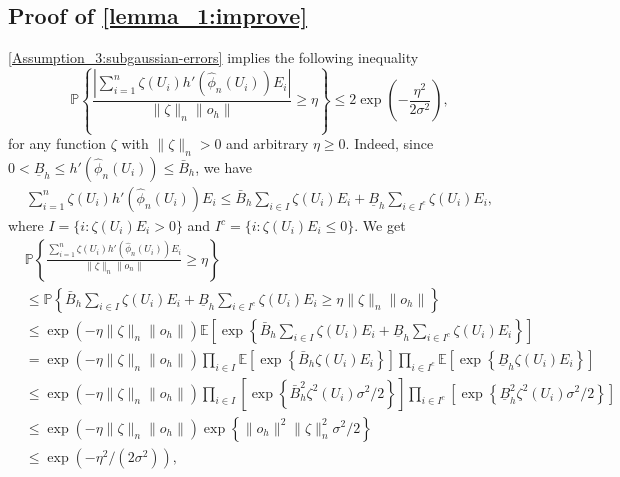 \documentclass{article} %
\begin{document}
\subsection{Proof of \cref{lemma_1:improve}}\label{sec:lemma_1:improve}
\cref{Assumption_3:subgaussian-errors} implies the following inequality
\begin{equation}\label{eq:concentration_lemma_dumbgen}
\mathbb{P}\left\{\frac{\left|\sum_{i=1}^n \zeta\left(U_i\right)h'(\widehat{\phi}_n\left(U_i\right)) E_i\right|}{\|\zeta\|_n \|o_h\|} \geq \eta\right\} \leq 2 \exp \left(-\frac{\eta^2}{2\sigma^2}\right),
\end{equation}
for any function $\zeta$ with $\|\zeta\|_n>0$ and arbitrary $\eta \geq 0$. Indeed, since $0<\underline{B}_{h} \leq h'(\widehat{\phi}_n\left(U_i\right)) \leq \bar{B}_{h}$, we have 
\begin{align}\label{key_ineq:improve}
\sum_{i=1}^n \zeta\left(U_i\right)h'(\widehat{\phi}_n\left(U_i\right)) E_i \leq \bar{B}_{h}\sum_{i\in I}\zeta\left(U_i\right)E_i
+ \underline{B}_{h}\sum_{i\in I^c}\zeta\left(U_i\right)E_i,
\end{align}
\noindent
where $I = \{i: \zeta\left(U_i\right)E_i >0\}$ and $I^c = \{i: \zeta\left(U_i\right)E_i \leq 0\}$. We get
\begin{align*}
&\mathbb{P}\left\{\frac{\sum_{i=1}^n \zeta\left(U_i\right)h'(\widehat{\phi}_n\left(U_i\right)) E_i}{\|\zeta\|_n \|o_n\|} \geq \eta\right\}\\
& \leq \mathbb{P}\left\{\bar{B}_{h}\sum_{i\in I}\zeta\left(U_i\right)E_i
+ \underline{B}_{h}\sum_{i\in I^c}\zeta\left(U_i\right)E_i \geq \eta \|\zeta\|_n \|o_h\|\right\} \\
& \leq \exp \left(-\eta \|\zeta\|_n \|o_h\|\right)\mathbb{E}\left[ \exp \left\{ \bar{B}_{h}\sum_{i\in I}\zeta\left(U_i\right)E_i
+ \underline{B}_{h}\sum_{i\in I^c}\zeta\left(U_i\right)E_i  \right\} \right]\\
& = \exp \left(-\eta \|\zeta\|_n \|o_h\|\right)\prod_{i\in I}\mathbb{E}\left[ \exp \left\{ \bar{B}_{h} \zeta\left(U_i\right)E_i \right\} \right] \prod_{i\in I^c}\mathbb{E}\left[\exp \left\{
\underline{B}_{h} \zeta\left(U_i\right)E_i  \right\} \right]\\
& \leq \exp \left(-\eta \|\zeta\|_n \|o_h\|\right)\prod_{i\in I}\left[ \exp \left\{ \bar{B}_{h}^2 \zeta^2\left(U_i\right)\sigma^2/2 \right\} \right] \prod_{i\in I^c}\left[\exp \left\{
\underline{B}_{h}^2 \zeta^2\left(U_i\right)\sigma^2/2  \right\} \right]\\
& \leq \exp \left(-\eta \|\zeta\|_n \|o_h\|\right) \exp \left\{  \|o_h\|^2\|\zeta\|_n^2\sigma^2/2 \right\}\\
& \leq \exp \left(-\eta^2 /(2\sigma^2)\right),
\end{align*}
\end{document}
